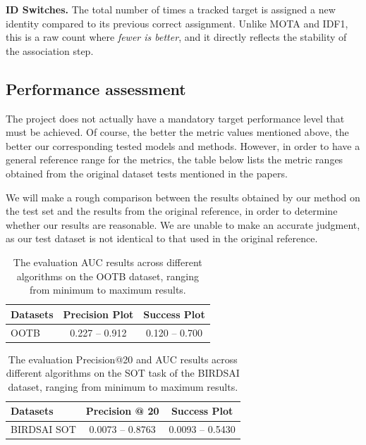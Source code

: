 \documentclass[
]{article}
\begin{document}
\textbf{ID Switches.} The total number of times a tracked target is assigned a new identity compared to its previous correct assignment. Unlike MOTA and IDF1, this is a raw count where \emph{fewer is better}, and it directly reflects the stability of the association step.


\hypertarget{Performance assessment}{%
\subsection{Performance assessment}\label{Performance assessment}}
The project does not actually have a mandatory target performance level that must be achieved. 
Of course, the better the metric values mentioned above, the better our corresponding tested models and methods. 
However, in order to have a general reference range for the metrics, the table below lists the metric ranges obtained from the original dataset tests mentioned in the papers.

We will make a rough comparison between the results obtained by our method on the test set and the results from the original reference, 
in order to determine whether our results are reasonable. We are unable to make an accurate judgment, 
as our test dataset is not identical to that used in the original reference.

\begin{table}[h]
\centering
\begin{tabular}{|l|c|c|}
\hline
\textbf{Datasets} & \textbf{Precision Plot} & \textbf{Success Plot} \\
\hline
OOTB & 0.227 -- 0.912 & 0.120 -- 0.700 \\
\hline
\end{tabular}
\caption{The evaluation AUC results across different algorithms on the OOTB dataset\cite{chen2022single}, ranging from minimum to maximum results.}
\label{tab:results}
\end{table}

\begin{table}[h]
\centering
\begin{tabular}{|l|c|c|}
\hline
\textbf{Datasets} & \textbf{Precision @ 20} & \textbf{Success Plot} \\
\hline
BIRDSAI SOT & 0.0073 -- 0.8763 & 0.0093 -- 0.5430 \\
\hline
\end{tabular}
\caption{The evaluation Precision@20 and AUC results across different algorithms on the SOT task of the BIRDSAI dataset\cite{bondi2020birdsai}, ranging from minimum to maximum results.}
\label{tab:birdsai_sot}
\end{table}
\end{document}
